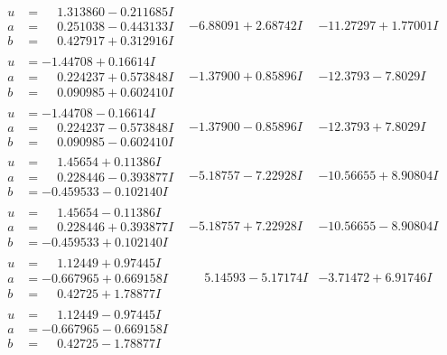 \documentclass[1p]{elsarticle_modified}
\theoremstyle{definition}
\begin{document}
$$\begin{array}{c|c|c}
\begin{aligned}
u &= \phantom{-}1.313860 - 0.211685 I \\
a &= \phantom{-}0.251038 - 0.443133 I \\
b &= \phantom{-}0.427917 + 0.312916 I\end{aligned}
 & -6.88091 + 2.68742 I & -11.27297 + 1.77001 I \\ \hline\begin{aligned}
u &= -1.44708 + 0.16614 I \\
a &= \phantom{-}0.224237 + 0.573848 I \\
b &= \phantom{-}0.090985 + 0.602410 I\end{aligned}
 & -1.37900 + 0.85896 I & -12.3793 - 7.8029 I \\ \hline\begin{aligned}
u &= -1.44708 - 0.16614 I \\
a &= \phantom{-}0.224237 - 0.573848 I \\
b &= \phantom{-}0.090985 - 0.602410 I\end{aligned}
 & -1.37900 - 0.85896 I & -12.3793 + 7.8029 I \\ \hline\begin{aligned}
u &= \phantom{-}1.45654 + 0.11386 I \\
a &= \phantom{-}0.228446 - 0.393877 I \\
b &= -0.459533 - 0.102140 I\end{aligned}
 & -5.18757 - 7.22928 I & -10.56655 + 8.90804 I \\ \hline\begin{aligned}
u &= \phantom{-}1.45654 - 0.11386 I \\
a &= \phantom{-}0.228446 + 0.393877 I \\
b &= -0.459533 + 0.102140 I\end{aligned}
 & -5.18757 + 7.22928 I & -10.56655 - 8.90804 I \\ \hline\begin{aligned}
u &= \phantom{-}1.12449 + 0.97445 I \\
a &= -0.667965 + 0.669158 I \\
b &= \phantom{-}0.42725 + 1.78877 I\end{aligned}
 & \phantom{-}5.14593 - 5.17174 I & -3.71472 + 6.91746 I \\ \hline\begin{aligned}
u &= \phantom{-}1.12449 - 0.97445 I \\
a &= -0.667965 - 0.669158 I \\
b &= \phantom{-}0.42725 - 1.78877 I\end{aligned}

\end{array}$$
\end{document}
